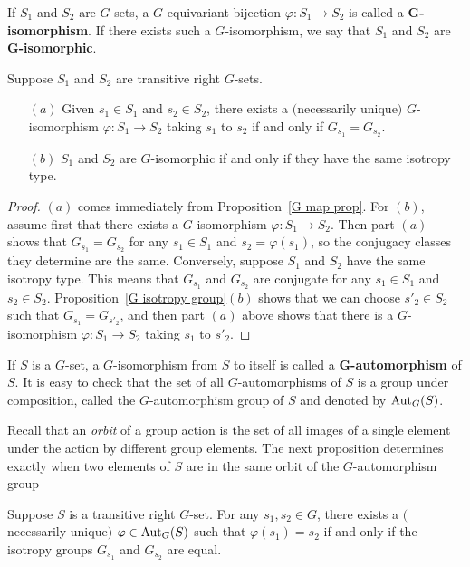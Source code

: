 If $S_1$ and $S_2$ are $G$-sets, a $G$-equivariant bijection $\varphi:S_1\to S_2$ is called a \textbf{$\bm{G}$-isomorphism}. If there exists such a $G$-isomorphism, we say that $S_1$ and $S_2$ are \textbf{$\bm{G}$-isomorphic}.
\begin{proposition}\label{G iso crit}
Suppose $S_1$ and $S_2$ are transitive right $G$-sets.
\begin{itemize}
\item[$(a)$] Given $s_1\in S_1$ and $s_2\in S_2$, there exists a $($necessarily unique$)$ $G$-isomorphism $\varphi:S_1\to S_2$ taking $s_1$ to $s_2$ if and only if $G_{s_1}=G_{s_2}$.
\item[$(b)$] $S_1$ and $S_2$ are $G$-isomorphic if and only if they have the same isotropy type.
\end{itemize}
\end{proposition}
\begin{proof}
$(a)$ comes immediately from Proposition~\ref{G map prop}. For $(b)$, assume first that there exists a $G$-isomorphism $\varphi:S_1\to S_2$. Then part $(a)$ shows that $G_{s_1}=G_{s_2}$ for any $s_1\in S_1$ and $s_2=\varphi(s_1)$, so the conjugacy
classes they determine are the same. Conversely, suppose $S_1$ and $S_2$ have the same
isotropy type. This means that $G_{s_1}$ and $G_{s_2}$ are conjugate for any $s_1\in S_1$ and $s_2\in S_2$. Proposition~\ref{G isotropy group}$(b)$ shows that we can 
choose $s'_2\in S_2$ such that $G_{s_1}=G_{s'_2}$, and then part $(a)$ above shows that there is a $G$-isomorphism $\varphi:S_1\to S_2$ taking $s_1$ to $s'_2$.
\end{proof}
If $S$ is a $G$-set, a $G$-isomorphism from $S$ to itself is called a \textbf{$\bm{G}$-automorphism} of $S$. It is easy to check that the set of all $G$-automorphisms of $S$ is a group under composition, called the $G$-automorphism group of $S$ and denoted by $\mathrm{Aut}_G(S)$.\par
Recall that an \textit{orbit} of a group action is the set of all images of a single element under the action by different group elements. The next proposition determines
exactly when two elements of $S$ are in the same orbit of the $G$-automorphism group
\begin{proposition}\label{orbit crit G auto}
Suppose $S$ is a transitive right $G$-set. For any $s_1,s_2\in G$, there exists a $($necessarily unique$)$ $\varphi\in\mathrm{Aut}_G(S)$ such that $\varphi(s_1)=s_2$ if and only if the isotropy groups $G_{s_1}$ and $G_{s_2}$ are equal.
\end{proposition}

